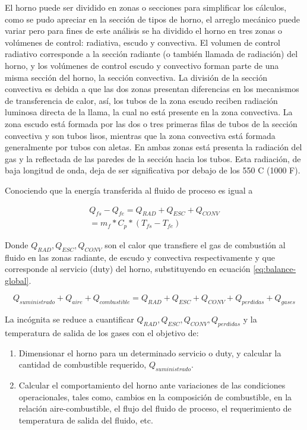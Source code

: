 \par El horno puede ser dividido en zonas o secciones para simplificar los cálculos, como se pudo apreciar en la sección de tipos de horno, el arreglo mecánico puede variar pero para fines de este análisis se ha dividido el horno en tres zonas o volúmenes de control: radiativa, escudo y convectiva. El volumen de control radiativo corresponde a la sección radiante (o también llamada de radiación) del horno, y los volúmenes de control escudo y convectivo forman parte de una misma sección del horno, la sección convectiva. La división de la sección convectiva es debida a que las dos zonas presentan diferencias en los mecanismos de transferencia de calor, así, los tubos de la zona escudo reciben radiación luminosa directa de la llama,  la cual no está presente en la zona convectiva. La zona escudo está formada por las dos o tres primeras filas de tubos de la sección convectiva y son tubos lisos, mientras que la zona convectiva está formada generalmente por tubos con aletas. En ambas zonas está presenta la radiación del gas y la reflectada de las paredes de la sección hacia los tubos. Esta radiación, de baja longitud de onda, deja de ser significativa por debajo de los 550 C (1000 F).
 
\par Conociendo que la energía transferida al fluido de proceso es igual a

\begin{equation}
    \begin{gathered}
    Q_{fs} - Q_{fe} = Q_{RAD} + Q_{ESC} + Q_{CONV}\\
               	    = m_f * C_p * (T_{fs} - T_{fe})
    \end{gathered}
\end{equation}

\par Donde $Q_{RAD}, Q_{ESC}, Q_{CONV}$ son el calor que transfiere el gas de combustión al fluido en las zonas radiante, de escudo y convectiva respectivamente y que corresponde al servicio (duty) del horno, substituyendo en ecuación \ref{eq:balance-global}.

\begin{equation}
    Q_{suministrado} + Q_{aire} + Q_{combustible} = Q_{RAD} + Q_{ESC} + Q_{CONV} + Q_{perdidas} + Q_{gases}
\end{equation}

\par La incógnita se reduce a cuantificar $Q_{RAD}, Q_{ESC}, Q_{CONV}, Q_{perdidas}$ y la temperatura de salida de los gases con el objetivo de:
\begin{enumerate}
    \item Dimensionar el horno para un determinado servicio o duty, y calcular la cantidad de combustible requerido, $Q_{suministrado}$.
    \item Calcular el comportamiento del horno ante variaciones de las condiciones operacionales, tales como, cambios en la composición de combustible, en la relación aire-combustible, el flujo del fluido de proceso, el requerimiento de temperatura de salida del fluido, etc.
\end{enumerate}


